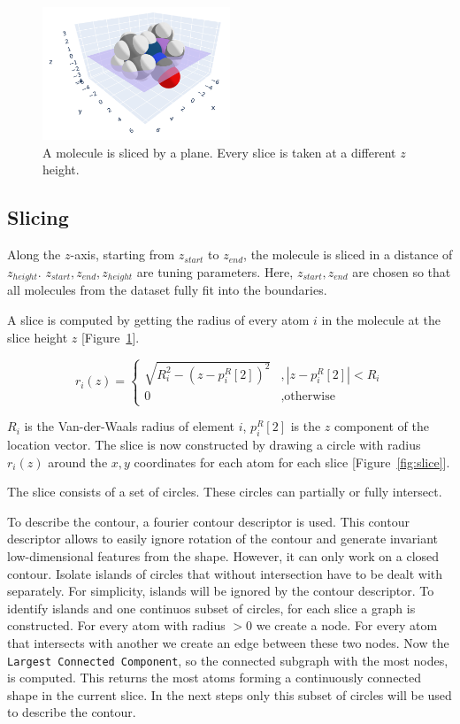 \begin{figure} [H]
  \centering
  \includegraphics[width=0.5\textwidth]{figures/fourier/slice3D.png} %
  \caption[Slicing a molecule]{A molecule is sliced by a plane. Every slice is taken at a different $z$ height.}
  \label{fig:slice3D}
\end{figure}

\subsection{Slicing}

Along the $z$-axis, starting from $z_{start}$ to $z_{end}$, the molecule is sliced in a distance of $z_{height}$.
$z_{start}, z_{end}, z_{height}$ are tuning parameters.
Here, $z_{start}, z_{end}$ are chosen so that all molecules from the dataset fully fit into the boundaries.

A slice is computed by getting the radius of every atom $i$ in the molecule at the slice height $z$ [Figure~\ref{fig:slice3D}].

$$ r_i(z) =\left\{\begin{array}{ll} \sqrt{R_i^2 - (z - p_i^R[2])^2} &, | z - p_i^R[2] |  < R_i\\
  0 &, \text{otherwise}\end{array}\right.
$$ %

$R_i$ is the Van-der-Waals radius of element $i$, $p_i^R[2]$ is the $z$ component of the location vector.
The slice is now constructed by drawing a circle with radius $r_i(z)$ around the $x,y$ coordinates for each atom for each slice [Figure~\ref{fig:slice}].


The slice consists of a set of circles.
These circles can partially or fully intersect. 

To describe the contour, a fourier contour descriptor is used.
This contour descriptor allows to easily ignore rotation of the contour and generate invariant low-dimensional features from the shape.
However, it can only work on a closed contour.
Isolate islands of circles that without intersection have to be dealt with separately.
For simplicity, islands will be ignored by the contour descriptor.
To identify islands and one continuos subset of circles, for each slice a graph is constructed.
For every atom with radius $>0$ we create a node.
For every atom that intersects with another we create an edge between these two nodes.
Now the \texttt{Largest Connected Component}, so the connected subgraph with the most nodes, is computed.
This returns the most atoms forming a continuously connected shape in the current slice.
In the next steps only this subset of circles will be used to describe the contour.

